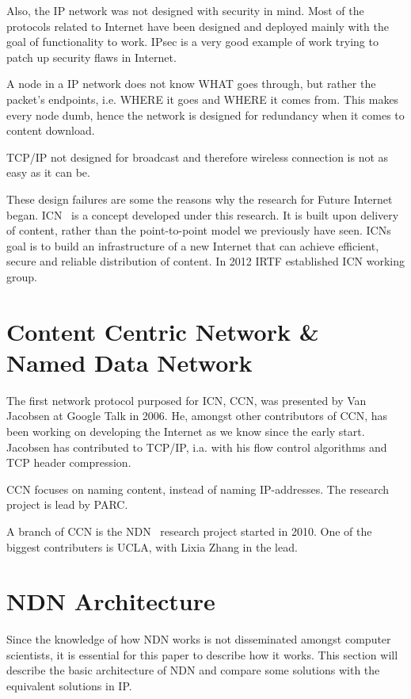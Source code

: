Also, the \gls{IP} network was not designed with security in mind. 
Most of the protocols related to Internet have been designed and deployed mainly with the goal of functionality to work.
\gls{IPsec} is a very good example of work trying to patch up security flaws in Internet.

A node in a \gls{IP} network does not know WHAT goes through, but rather the packet's endpoints, i.e. WHERE it goes and WHERE it comes from. 
This makes every node dumb, hence the network is designed for redundancy when it comes to content download.

\gls{TCP}/\gls{IP} not designed for broadcast and therefore wireless connection is not as easy as it can be.

These design failures are some the reasons why the research for Future Internet began.  
\gls{ICN}~\cite{DBLP:journals/cm/AhlgrenDIKO12} is a concept developed under this research.
It is built upon delivery of content, rather than the point-to-point model we previously have seen.
\gls{ICN}s goal is to build an infrastructure of a new Internet that can achieve efficient, secure and reliable distribution of content.
In 2012 \gls{IRTF} established \gls{ICN} working group.


\section{Content Centric Network \& Named Data Network}\label{chp2:sec:icn}
The first network protocol purposed for \gls{ICN}, \gls{CCN}, was presented by Van Jacobsen at Google Talk in 2006. 
He, amongst other contributors of \gls{CCN}, has been working on developing the Internet as we know since the early start.
Jacobsen has contributed to \gls{TCP}/\gls{IP}, i.a. with his flow control algorithms and \gls{TCP} header compression. 

\gls{CCN} focuses on naming content, instead of naming \gls{IP}-addresses. 
The research project is lead by \gls{PARC}.

A branch of \gls{CCN} is the \gls{NDN}~\cite{DBLP:journals/ccr/0001ABJcCPWZ14} research project started in 2010.
One of the biggest contributers is \gls{UCLA}, with Lixia Zhang in the lead.

\section{NDN Architecture}\label{chp2:sec:ndn_architecture}
Since the knowledge of how \gls{NDN} works is not disseminated amongst computer scientists, it is essential for this paper to describe how it works.
This section will describe the basic architecture of \gls{NDN} and compare some solutions with the equivalent solutions in \gls{IP}.

